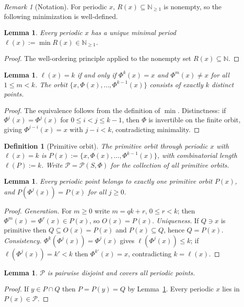 \documentclass[12pt,a4paper]{article}
\newtheorem{lemma}[theorem]{Lemma}
\newtheorem{definition}[theorem]{Definition}
\theoremstyle{remark}
\newtheorem*{remark}{Remark}
\begin{document}
\begin{remark}[Notation]
For periodic $x$, $R(x)\subseteq\mathbb{N}_{\ge1}$ is nonempty,
so the following minimization is well-defined.
\end{remark}

\begin{lemma}\label{lem:L3}
Every periodic $x$ has a unique minimal period
$\ell(x):=\min R(x)\in\mathbb{N}_{\ge1}$.
\end{lemma}
\begin{proof}The well-ordering principle applied to the nonempty set $R(x)\subseteq\mathbb{N}$.\end{proof}

\begin{lemma}\label{lem:L4}
$\ell(x)=k$ if and only if $\Phi^k(x)=x$ and $\Phi^m(x)\neq x$ for all $1\le m<k$.
The orbit $\{x,\Phi(x),\ldots,\Phi^{k-1}(x)\}$ consists of exactly $k$ distinct points.
\end{lemma}
\begin{proof}
The equivalence follows from the definition of $\min$.
Distinctness: if $\Phi^i(x)=\Phi^j(x)$ for $0\le i<j\le k-1$,
then $\Phi$ is invertible on the finite orbit, giving
$\Phi^{j-i}(x)=x$ with $j-i<k$, contradicting minimality.
\end{proof}

\begin{definition}[Primitive orbit]
The \emph{primitive orbit} through periodic $x$ with $\ell(x)=k$ is
$P(x):=\{x,\Phi(x),\ldots,\Phi^{k-1}(x)\}$, with
\emph{combinatorial length} $\ell(P):=k$.
Write $\mathcal{P}=\mathcal{P}(S,\Phi)$ for the collection of all primitive orbits.
\end{definition}

\begin{lemma}\label{lem:L5}
Every periodic point belongs to exactly one primitive orbit $P(x)$,
and $P(\Phi^j(x))=P(x)$ for all $j\ge0$.
\end{lemma}
\begin{proof}
\emph{Generation.} For $m\ge0$ write $m=qk+r$, $0\le r<k$; then
$\Phi^m(x)=\Phi^r(x)\in P(x)$, so $O(x)=P(x)$.
\emph{Uniqueness.} If $Q\ni x$ is primitive then
$Q\subseteq O(x)=P(x)$ and $P(x)\subseteq Q$, hence $Q=P(x)$.
\emph{Consistency.} $\Phi^k(\Phi^j(x))=\Phi^j(x)$ gives
$\ell(\Phi^j(x))\le k$; if $\ell(\Phi^j(x))=k'<k$ then
$\Phi^{k'}(x)=x$, contradicting $k=\ell(x)$.
\end{proof}

\begin{lemma}\label{lem:L6}
$\mathcal{P}$ is pairwise disjoint and covers all periodic points.
\end{lemma}
\begin{proof}
If $y\in P\cap Q$ then $P=P(y)=Q$ by Lemma~\ref{lem:L5}.
Every periodic $x$ lies in $P(x)\in\mathcal{P}$.
\end{proof}
\end{document}
